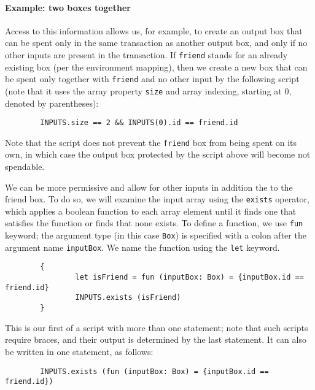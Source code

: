 \documentclass[11pt]{article}
\newcommand{\authnote}[2]{\marginpar{\parbox{\marginparwidth}{\tiny %
  \textsf{#1 {\textcolor{blue}{notes: #2}}}}}%
  \textcolor{blue}{\textbf{\dag}}}
\newcommand{\authnote}[2]{
  \textsf{#1 \textcolor{blue}{: #2}}}
\newcommand{\authnote}[2]{}
\newcommand{\lnote}[1]{{\authnote{\textcolor{orange}{Leo notes}}{#1}}}
\begin{document}
\lnote{ The comments in ErgoBox.scala says something about a unique nonce, but that doesn't seem to be matched by code. The code has transactionID and index, which seems to be hashed; if it is unique, then the hash will be unique, but I can't quite tell.}

\paragraph{Example: two boxes together}
Access to this information allows us, for example, to create an output box that can be spent only in the same transaction as another output box, and only if no other inputs are present in the transaction. If \texttt{friend} stands for an already existing box (per the environment mapping), then we create a new box that can be spent only together with \texttt{friend} and no other input by the following script (note that it uses the array property \texttt{size} and array indexing, starting at 0, denoted by parentheses):

\begin{verbatim}
        INPUTS.size == 2 && INPUTS(0).id == friend.id
\end{verbatim}

Note that the script does not prevent the \texttt{friend} box from being spent on its own, in which case the output box protected by the script above will become not spendable.

We can be more permissive and allow for other inputs in addition the to the friend box. To do so, we will examine the input array using the \texttt{exists} operator, which applies a boolean function to each array element until it finds one that satisfies the function or finds that none exists. To define a function, we use \texttt{fun} keyword; the argument type (in this case \texttt{Box}) is specified with a colon after the argument name \texttt{inputBox}. We name the function using the \texttt{let} keyword.
\begin{verbatim}
        {
                let isFriend = fun (inputBox: Box) = {inputBox.id == friend.id}
                INPUTS.exists (isFriend)
        }
\end{verbatim}

This is our first of a script with more than one statement; note that such scripts require braces, and their output is determined by the last statement.
It can also be written in one statement, as follows:
\begin{verbatim}
        INPUTS.exists (fun (inputBox: Box) = {inputBox.id == friend.id})
\end{verbatim}
\end{document}
